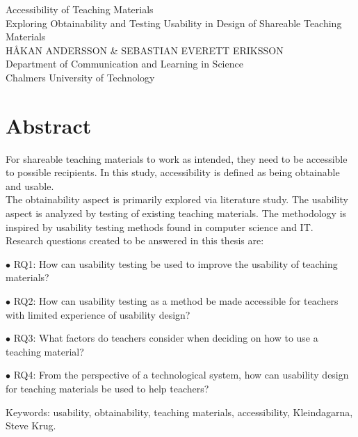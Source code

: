 Accessibility of Teaching Materials\\
Exploring Obtainability and Testing Usability in Design of Shareable Teaching Materials\\
HÅKAN ANDERSSON \& SEBASTIAN EVERETT ERIKSSON\\
Department of Communication and Learning in Science\\
Chalmers University of Technology \setlength{\parskip}{0.5cm}

\thispagestyle{plain}			%
\setlength{\parskip}{0pt plus 1.0pt}
\section*{Abstract}
For shareable teaching materials to work as intended, they need to be accessible to possible recipients. In this study, accessibility is defined as being obtainable and usable. \\[0.5cm]
The obtainability aspect is primarily explored via literature study. The usability aspect is analyzed by testing of existing teaching materials. The methodology is inspired by usability testing methods found in computer science and IT. \\[0.5cm]
Research questions created to be answered in this thesis are:
\begin{description}
    \item $\bullet$ RQ1: How can usability testing be used to improve the usability of teaching materials?
    \item $\bullet$ RQ2: How can usability testing as a method be made accessible for teachers with limited experience of usability design?
    \item $\bullet$ RQ3: What factors do teachers consider when deciding on how to use a teaching material?
    \item $\bullet$ RQ4: From the perspective of a technological system, how can usability design for teaching materials be used to help teachers?
\end{description}


\vfill
Keywords: usability, obtainability, teaching materials, accessibility, Kleindagarna, Steve Krug.

\newpage				%
\thispagestyle{empty}
\mbox{}
